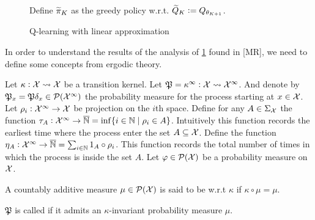 \begin{figure}[H]
\begin{algorithm}[H] %
  \caption{Q-learning with linear approximation}

  Define $\widetilde{\pi}_K$ as the greedy policy w.r.t.
  $\widetilde{Q}_K \vcentcolon= Q_{\theta_{K+1}}$.

  \label{alg:QLlinear}
\end{algorithm}
\end{figure}

In order to understand the results of the analysis of \cref{alg:QLlinear}
found in [MR],
we need to define some concepts from ergodic theory.

Let $\kappa : \mathcal{X} \leadsto \mathcal{X}$ be a transition kernel.
Let $\mathfrak{P} = \kappa^\infty : \mathcal{X} \leadsto \mathcal{X}^\infty$.
And denote by
$\mathfrak{P}_x = \mathfrak{P}\delta_x \in \mathcal{P}(\mathcal{X}^\infty)$
the probability measure for the process starting at $x \in \mathcal{X}$.
Let $\rho_i : \mathcal{X}^\infty \to \mathcal{X}$ be projection on the
$i$th space.
Define for any $A \in \Sigma_{\mathcal{X}}$ the function
$\tau_A : \mathcal{X}^\infty \to \overline{\mathbb{N}} = \inf\{ i \in \mathbb{N} \mid \rho_i \in A \}$.
Intuitively this function records the earliest time where the process
enter the set $A \subseteq \mathcal{X}$.
Define the function
$\eta_A : \mathcal{X}^\infty \to \overline{\mathbb{N}} = \sum_{i \in \mathbb{N}} 1_A \circ \rho_i$.
This function records the total number of times in which the process is
inside the set $A$.
Let $\varphi \in \mathcal{P}(\mathcal{X})$ be a probability measure on $\mathcal{X}$.

\begin{defn}
  A countably additive measure $\mu \in \mathcal{P}(\mathcal{X})$ is said
  to be  w.r.t $\kappa$ if $\kappa \circ \mu = \mu$.
\end{defn}

\begin{defn}[Positivity]
  \leavevmode

  $\mathfrak{P}$ is called  if it admits an $\kappa$-invariant
  probability measure $\mu$.
\end{defn}

